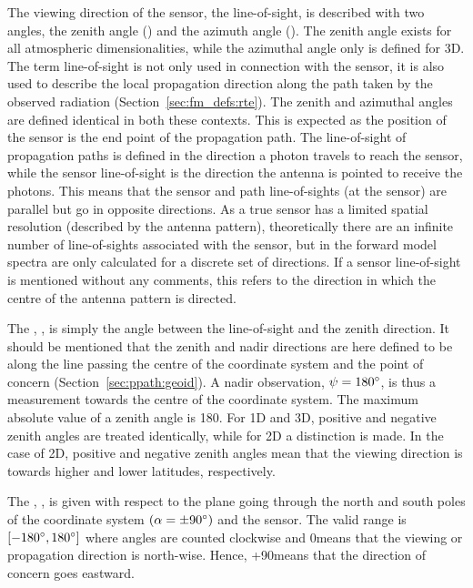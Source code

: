 The viewing direction of the sensor, the line-of-sight, is described
with two angles, the zenith angle (\ZntAng) and the azimuth angle
(\AzmAng). The zenith angle exists for all atmospheric
dimensionalities, while the azimuthal angle only is defined for 3D.
The term line-of-sight is not only used in connection with the sensor,
it is also used to describe the local propagation direction along the
path taken by the observed radiation (Section~\ref{sec:fm_defs:rte}).
The zenith and azimuthal angles are defined identical in both these
contexts. This is expected as the position of the sensor is the end
point of the propagation path. The line-of-sight of propagation paths
is defined in the direction a photon travels to reach the sensor,
while the sensor line-of-sight is the direction the antenna is pointed
to receive the photons. This means that the sensor and path
line-of-sights (at the sensor) are parallel but go in opposite
directions. As a true sensor has a limited spatial resolution
(described by the antenna pattern), theoretically there are an
infinite number of line-of-sights associated with the sensor, but in
the forward model spectra are only calculated for a discrete set of
directions. If a sensor line-of-sight is mentioned without any
comments, this refers to the direction in which the centre of the
antenna pattern is directed.

The , \ZntAng, is simply the angle between the
line-of-sight and the zenith direction. It should be mentioned that
the zenith and nadir directions are here defined to be along the line
passing the centre of the coordinate system and the point of concern
(Section~\ref{sec:ppath:geoid}). A nadir observation,
$\psi=180^\circ$, is thus a measurement towards the centre of the
coordinate system. The maximum absolute value of a zenith angle is
180\degree. For 1D and 3D, positive and negative zenith angles are
treated identically, while for 2D a distinction is made. In the case
of 2D, positive and negative zenith angles mean that the viewing
direction is towards higher and lower latitudes, respectively.

The , \AzmAng, is given with respect to the
plane going through the north and south poles of the coordinate system
$(\alpha=\pm90^\circ)$ and the sensor. The valid range is
$[-180^\circ,180^\circ]$ where angles are counted clockwise and
0\degree means that the viewing or propagation direction is north-wise.
Hence, +90\degree means that the direction of concern goes eastward.

